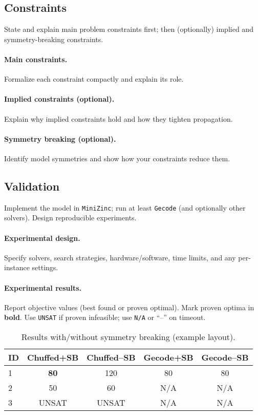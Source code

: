 \documentclass{article}
\begin{document}
\subsection{Constraints}
State and explain main problem constraints first; then (optionally) implied and symmetry-breaking constraints.

\paragraph{Main constraints.}
Formalize each constraint compactly and explain its role.

\paragraph{Implied constraints (optional).}
Explain why implied constraints hold and how they tighten propagation.

\paragraph{Symmetry breaking (optional).}
Identify model symmetries and show how your constraints reduce them.

\subsection{Validation}
Implement the model in \texttt{MiniZinc}; run at least \texttt{Gecode}
(and optionally other solvers). Design reproducible experiments.

\paragraph{Experimental design.}
Specify solvers, search strategies, hardware/software, time limits, and any per-instance settings.

\paragraph{Experimental results.}
Report objective values (best found or proven optimal).
Mark proven optima in \textbf{bold}. Use \texttt{UNSAT} if proven infeasible; use \texttt{N/A} or ``--'' on timeout.

\begin{table}[h]
\centering
\caption{Results with/without symmetry breaking (example layout).}
\label{tab:cp}
\begin{tabular}{lcccc}
\toprule
\textbf{ID} & \textbf{Chuffed+SB} & \textbf{Chuffed--SB} & \textbf{Gecode+SB} & \textbf{Gecode--SB}\\
\midrule
1 & \textbf{80} & 120 & 80 & 80 \\
2 & 50 & 60 & N/A & N/A \\
3 & UNSAT & UNSAT & N/A & N/A \\
\bottomrule
\end{tabular}
\end{table}
\end{document}
